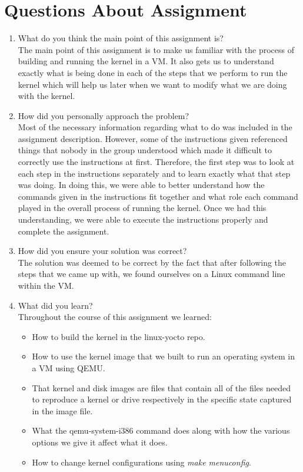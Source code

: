 \documentclass[onecolumn,draftclsnofoot, 10pt, compsoc]{IEEEtran}
\begin{document}
\section{Questions About Assignment}
	\begin{enumerate}
		\item What do you think the main point of this assignment is? \\
			The main point of this assignment is to make us familiar with the process of building and running the kernel in a VM.
			It also gets us to understand exactly what is being done in each of the steps that we perform to run the kernel which will help us later when we want to modify what we are doing with the kernel.
		\item How did you personally approach the problem? \\
			Most of the necessary information regarding what to do was included in the assignment description.
			However, some of the instructions given referenced things that nobody in the group understood which made it difficult to correctly use the instructions at first.
			Therefore, the first step was to look at each step in the instructions separately and to learn exactly what that step was doing.
			In doing this, we were able to better understand how the commands given in the instructions fit together and what role each command played in the overall process of running the kernel.
			Once we had this understanding, we were able to execute the instructions properly and complete the assignment.
		\item How did you ensure your solution was correct? \\
			The solution was deemed to be correct by the fact that after following the steps that we came up with, we found ourselves on a Linux command line within the VM.			
		\item What did you learn? \\
			Throughout the course of this assignment we learned:
			\begin{itemize}
				\item
					How to build the kernel in the linux-yocto repo.
				\item
					How to use the kernel image that we built to run an operating system in a VM using QEMU.
				\item 
					That kernel and disk images are files that contain all of the files needed to reproduce a kernel or drive respectively in the specific state captured in the image file.
				\item 
					What the qemu-system-i386 command does along with how the various options we give it affect what it does.
				\item 
					How to change kernel configurations using \textit{make menuconfig}.		
			\end{itemize}
	\end{enumerate}
\end{document}
